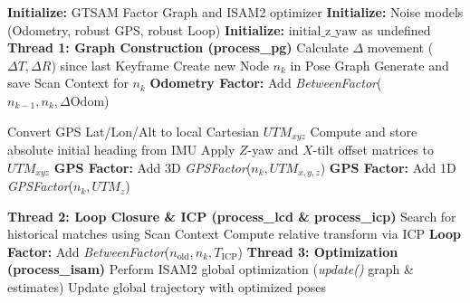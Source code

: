 \documentclass[12pt, a4paper]{article}
\begin{document}
{
    \singlespacing
    \begin{algorithm}[H]
    \caption{Back-End Pose Graph Optimization (PGO)}
    \begin{algorithmic}[1]
    \State \textbf{Initialize:} GTSAM Factor Graph and ISAM2 optimizer
    \State \textbf{Initialize:} Noise models (Odometry, robust GPS, robust Loop)
    \State \textbf{Initialize:} $\text{initial\_z\_yaw}$ as undefined
        \State \textbf{Thread 1: Graph Construction (process\_pg)}
            \State Calculate $\Delta$ movement ($\Delta T, \Delta R$) since last Keyframe
                \State Create new Node $n_k$ in Pose Graph
                \State Generate and save Scan Context for $n_k$
                \State \textbf{Odometry Factor:} Add \textit{BetweenFactor}($n_{k-1}, n_k, \Delta\text{Odom}$)
                
                    \State Convert GPS Lat/Lon/Alt to local Cartesian $UTM_{xyz}$
                        \State Compute and store absolute initial heading from IMU
                    \EndIf
                    \State Apply $Z$-yaw and $X$-tilt offset matrices to $UTM_{xyz}$
                        \State \textbf{GPS Factor:} Add 3D \textit{GPSFactor}($n_k, UTM_{x,y,z}$)
                    \Else
                        \State \textbf{GPS Factor:} Add 1D \textit{GPSFactor}($n_k, UTM_z$) 
                    \EndIf
                \EndIf
            \EndIf
        \EndIf

        \State \textbf{Thread 2: Loop Closure \& ICP (process\_lcd \& process\_icp)}
        \State Search for historical matches using Scan Context
            \State Compute relative transform via ICP
                \State \textbf{Loop Factor:} Add \textit{BetweenFactor}($n_{\text{old}}, n_k, T_{\text{ICP}}$)
            \EndIf
        \EndIf
        \State \textbf{Thread 3: Optimization (process\_isam)}
        \State Perform ISAM2 global optimization (\textit{update()} graph \& estimates)
        \State Update global trajectory with optimized poses
    \EndWhile
    \end{algorithmic}
    \end{algorithm}
}
\end{document}
